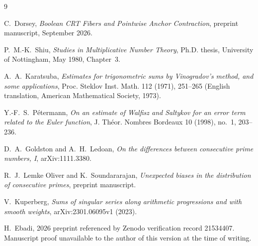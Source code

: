 \documentclass[11pt]{article}
\theoremstyle{definition}
\theoremstyle{remark}
\newcommand{\1}{\mathbf 1}
\begin{document}
\begin{thebibliography}{9}

C.~Dorsey,
\emph{Boolean CRT Fibers and Pointwise Anchor Contraction},
preprint manuscript, September 2026.

P.~M.-K.~Shiu,
\emph{Studies in Multiplicative Number Theory},
Ph.D. thesis, University of Nottingham, May 1980, Chapter~3.

A.~A.~Karatsuba,
\emph{Estimates for trigonometric sums by Vinogradov's method, and some applications},
Proc. Steklov Inst. Math. 112 (1971), 251--265
(English translation, American Mathematical Society, 1973).

Y.-F.~S.~P\'etermann,
\emph{On an estimate of Walfisz and Saltykov for an error term related to the Euler function},
J. Th\'eor. Nombres Bordeaux 10 (1998), no.~1, 203--236.

D.~A.~Goldston and A.~H.~Ledoan,
\emph{On the differences between consecutive prime numbers, I},
arXiv:1111.3380.

R.~J.~Lemke Oliver and K.~Soundararajan,
\emph{Unexpected biases in the distribution of consecutive primes},
preprint manuscript.

V.~Kuperberg,
\emph{Sums of singular series along arithmetic progressions and with smooth weights},
arXiv:2301.06095v1 (2023).

H.~Ebadi,
2026 preprint referenced by Zenodo verification record 21534407.
Manuscript proof unavailable to the author of this version at the time of writing.

\end{thebibliography}
\end{document}

